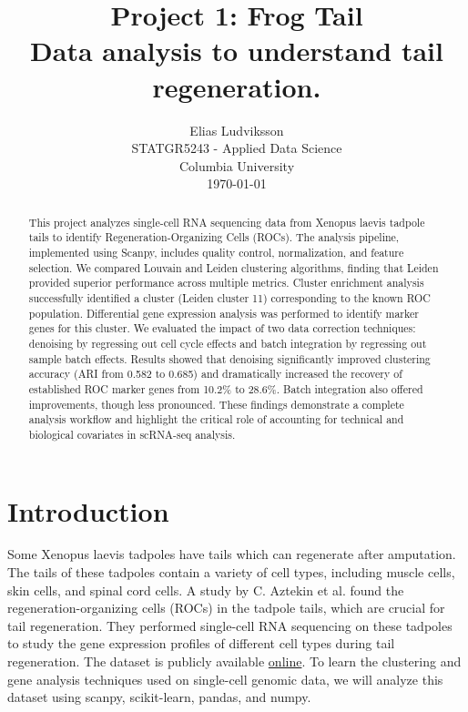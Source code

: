 \documentclass[12pt,letterpaper]{article}
\title{
    \vspace{2cm}
    \textbf{Project 1: Frog Tail}\\
    \vspace{0.5cm}
    \large Data analysis to understand tail regeneration.\\
    \vspace{1cm}
}
\author{
    Elias Ludviksson \\
    STATGR5243 - Applied Data Science \\
    Columbia University \\
    \vspace{0.5cm}
    \today
}
\date{}
\begin{document}
\maketitle
\newpage

\begin{abstract}
This project analyzes single-cell RNA sequencing data from Xenopus laevis tadpole tails to identify Regeneration-Organizing Cells (ROCs). The analysis pipeline, implemented using Scanpy, includes quality control, normalization, and feature selection. We compared Louvain and Leiden clustering algorithms, finding that Leiden provided superior performance across multiple metrics. Cluster enrichment analysis successfully identified a cluster (Leiden cluster 11) corresponding to the known ROC population. Differential gene expression analysis was performed to identify marker genes for this cluster. We evaluated the impact of two data correction techniques: denoising by regressing out cell cycle effects and batch integration by regressing out sample batch effects. Results showed that denoising significantly improved clustering accuracy (ARI from 0.582 to 0.685) and dramatically increased the recovery of established ROC marker genes from 10.2\% to 28.6\%. Batch integration also offered improvements, though less pronounced. These findings demonstrate a complete analysis workflow and highlight the critical role of accounting for technical and biological covariates in scRNA-seq analysis.
\end{abstract}

\newpage
\setcounter{page}{1}
\tableofcontents
\newpage

\section{Introduction}

Some Xenopus laevis tadpoles have tails which can regenerate after amputation. The tails of these tadpoles contain a variety of cell types, including muscle cells, skin cells, and spinal cord cells.
A study by C. Aztekin et al. found the regeneration-organizing cells (ROCs) in the tadpole tails, which are crucial for tail regeneration. They performed single-cell RNA sequencing on these tadpoles to study the gene expression profiles of different cell types during tail regeneration.
The dataset is publicly available \href{https://ftp.ebi.ac.uk/biostudies/fire/E-MTAB-/716/E-MTAB-7716/Files/arrayExpressUpload.zip}{online}. To learn the clustering and gene analysis techniques used on single-cell genomic data, we will analyze this dataset using scanpy, scikit-learn, pandas, and numpy.
\end{document}
